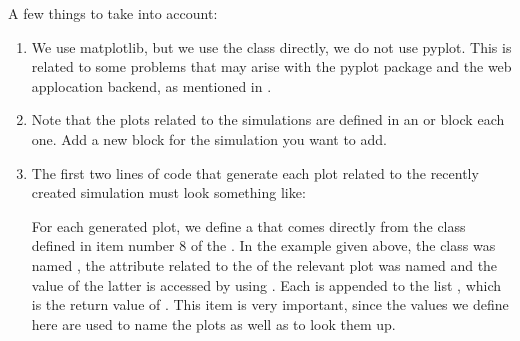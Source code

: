 \documentclass[a4paper,landscape,10pt,english]{sphinxmanual}
\begin{document}
A few things to take into account:
\begin{enumerate}
%
\item {} 
We use matplotlib, but we use the class  directly, we do not use
pyplot. This is related to some problems that may arise with the pyplot
package and the web applocation backend, as mentioned in
.

\item {} 
Note that the plots related to the simulations are defined in an  or
 block each one. Add a new block for the simulation you want to add.

\item {} 
The first two lines of code that generate each plot related to the recently
created simulation must look something like:

\begin{sphinxVerbatim}[commandchars=\\\{\}]
  
\end{sphinxVerbatim}

For each generated plot, we define a  that comes directly
from the class defined in item number 8 of the
{\hyperref[\detokenize{code_docs/new_simulation:new-simulation-schemas}]{}}. In the example given above,
the class was named , the attribute related to the
 of the relevant plot was named  and the value
of the latter is accessed by using .
Each  is appended to the list ,
which is the return value of {\hyperref[\detokenize{code_docs/simulation_API.controller:simulation_API.controller.tasks._plot_solution}]{}}.
This item is very important, since the values we define here are used to name
the plots as well as to look them up.


\end{enumerate}
\end{document}
